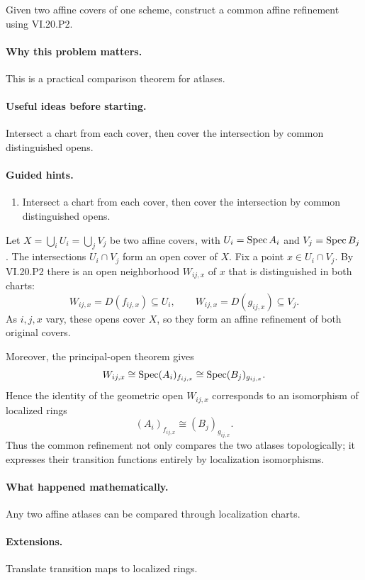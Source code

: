 \begin{problem}\label{prob:vi20-p12}
Given two affine covers of one scheme, construct a common affine refinement using VI.20.P2.
\end{problem}

\ifdefined\FullProblemDossiers
\paragraph{Why this problem matters.}
This is a practical comparison theorem for atlases.

\paragraph{Useful ideas before starting.}
Intersect a chart from each cover, then cover the intersection by common distinguished opens.

\paragraph{Guided hints.}
\begin{enumerate}
\item Intersect a chart from each cover, then cover the intersection by common distinguished opens.
\end{enumerate}

\begin{solution}
Let $X=\bigcup_iU_i=\bigcup_jV_j$ be two affine covers, with $U_i=\operatorname{Spec} A_i$ and $V_j=\operatorname{Spec} B_j$.  The intersections $U_i\cap V_j$ form an open cover of $X$.  Fix a point $x\in U_i\cap V_j$.  By VI.20.P2 there is an open neighborhood $W_{ij,x}$ of $x$ that is distinguished in both charts:
\[
W_{ij,x}=D(f_{ij,x})\subseteq U_i,
\qquad
W_{ij,x}=D(g_{ij,x})\subseteq V_j.
\]
As $i,j,x$ vary, these opens cover $X$, so they form an affine refinement of both original covers.

Moreover, the principal-open theorem gives
\[
W_{ij,x}\cong\operatorname{Spec}(A_i)_{f_{ij,x}}
\cong\operatorname{Spec}(B_j)_{g_{ij,x}}.
\]
Hence the identity of the geometric open $W_{ij,x}$ corresponds to an isomorphism of localized rings
\[
(A_i)_{f_{ij,x}}\cong(B_j)_{g_{ij,x}}.
\]
Thus the common refinement not only compares the two atlases topologically; it expresses their transition functions entirely by localization isomorphisms.
\end{solution}


\paragraph{What happened mathematically.}
Any two affine atlases can be compared through localization charts.

\paragraph{Extensions.}
Translate transition maps to localized rings.
\fi
